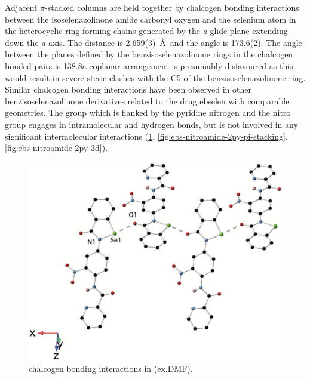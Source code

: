 \begin{refsection}
Adjacent $\pi$-stacked columns are held together by chalcogen bonding interactions between the isoselenazolinone amide carbonyl oxygen and the selenium atom in the heterocyclic ring forming chains generated by the \emph{a}-glide plane extending down the \emph{a}-axis.
The  distance is 2.659(3)~\AA~and the  angle is 173.6(2)\degree.
The angle between the planes defined by the benzisoselenazolinone rings in the chalcogen bonded pairs is 138.8\degree a coplanar arrangement is presumably disfavoured as this would result in severe steric clashes with the C5 of the benzisoselenazolinone ring.
Similar  chalcogen bonding interactions have been observed in other benzisoselenazolinone derivatives related to the drug ebselen with comparable geometries.\autocite{Fellowes2019,Thomas2015,Bhabak2007,Piatek1995}
The  group which is flanked by the pyridine nitrogen and the nitro group engages in intramolecular  and  hydrogen bonds, but is not involved in any significant intermolecular interactions (\cref{fig:ebs-nitroamide-2py-o-se}, \cref{fig:ebs-nitroamide-2py-pi-stacking}, \cref{fig:ebs-nitroamide-2py-3d}).

\begin{figure}
    \centering
    \includegraphics[width=0.8\linewidth]{Figures/ebs-nitroamide-2py-o-se.pdf}
    \caption{ chalcogen bonding interactions in (ex.DMF).}
    \label{fig:ebs-nitroamide-2py-o-se}
\end{figure}


\end{refsection}
